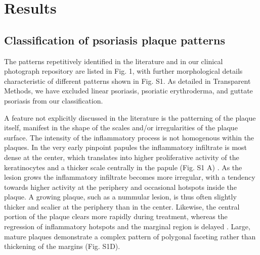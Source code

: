 \section{Results}
\subsection{Classification of psoriasis plaque patterns}
The patterns repetitively identified in the literature and in our clinical photograph repository are listed in Fig. 1, with further morphological details characteristic of different patterns shown in Fig. S1. As detailed in Transparent Methods, we have excluded linear psoriasis, psoriatic erythroderma, and guttate psoriasis from our classification. 

A feature not explicitly discussed in the literature is the patterning of the plaque itself, manifest in the shape of the scales and/or irregularities of the plaque surface. The intensity of the inflammatory process is not homogenous within the plaques. In the very early pinpoint papules the inflammatory infiltrate is most dense at the center, which translates into higher proliferative activity of the keratinocytes and a thicker scale centrally in the papule (Fig. S1 A) \citep{soltani1972}. As the lesion grows the inflammatory infiltrate becomes more irregular, with a tendency towards higher activity at the periphery and occasional hotspots inside the plaque. A growing plaque, such as a nummular lesion, is thus often slightly thicker and scalier at the periphery than in the center. Likewise, the central portion of the plaque clears more rapidly during treatment, whereas the regression of inflammatory hotspots and the marginal region is delayed \citep{griffin1988}. Large, mature plaques demonstrate a complex pattern of polygonal faceting rather than thickening of the margins (Fig. S1D).

